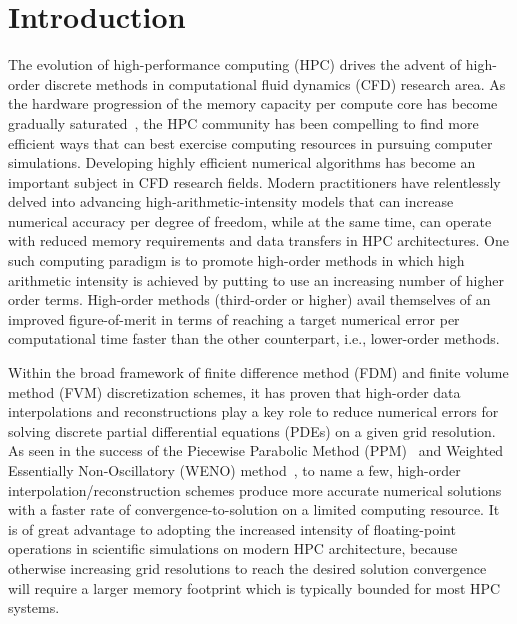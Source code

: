 \documentclass[times,preprint,3p]{elsarticle}
\begin{document}
\section{Introduction}\label{sec:introduction}
The evolution of high-performance computing (HPC) drives
the advent of high-order discrete methods
in computational fluid dynamics (CFD) research area.
As the hardware progression of the memory capacity per compute core
has become gradually saturated~\cite{attig2011trends, subcommittee2014top},
the HPC community has been compelling to find more efficient ways
that can best exercise computing resources in pursuing computer simulations.
Developing highly efficient numerical algorithms has
become an important subject in CFD research fields.
%
Modern practitioners have relentlessly delved into advancing
high-arithmetic-intensity models that can increase numerical accuracy per
degree of freedom, while at the same time, can operate with reduced
memory requirements and data transfers in HPC architectures.
One such computing paradigm is to promote high-order methods
in which high arithmetic intensity is achieved by putting to use an increasing number of
higher order terms.
High-order methods (third-order or higher) avail themselves of
an improved figure-of-merit in terms of
reaching a target numerical error per computational time faster
than the other counterpart, i.e., lower-order methods.



Within the broad framework of finite difference method (FDM) and
finite volume method (FVM) discretization schemes,
it has proven that high-order data interpolations and reconstructions
play a key role to reduce numerical errors
for solving discrete partial differential equations (PDEs)
on a given grid resolution.
As seen in the success of the
Piecewise Parabolic Method (PPM)~\cite{colella1984piecewise} and
Weighted Essentially Non-Oscillatory (WENO) method~\cite{jiang1996efficient},
to name a few, high-order interpolation/reconstruction schemes
produce more accurate numerical solutions
with a faster rate of convergence-to-solution on a limited computing resource.
%
It is of great advantage to adopting the increased intensity of floating-point operations
in scientific simulations on modern HPC architecture,
because otherwise increasing grid resolutions to reach the desired solution convergence
will require a larger memory footprint
which is typically bounded for most HPC systems.
\end{document}
